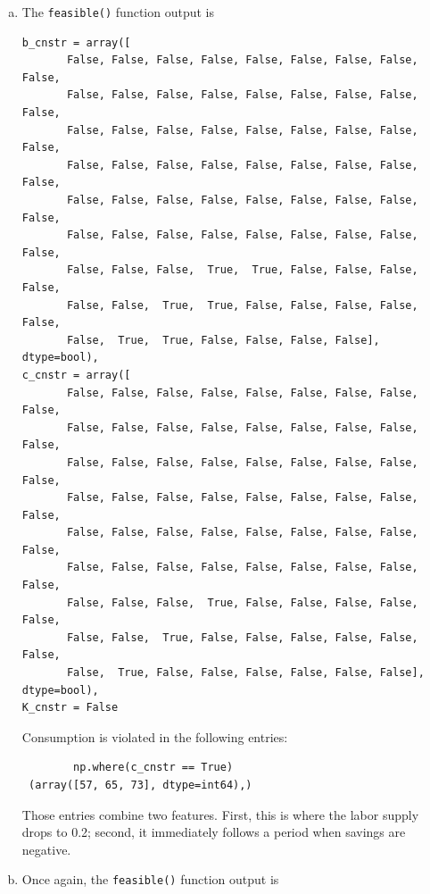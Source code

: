 \documentclass[letterpaper,12pt]{article}
\theoremstyle{definition}
\begin{document}
\begin{enumerate}
\begin{enumerate}[(a)]
		\item The \texttt{feasible()} function output is
		
		\begin{verbatim}
b_cnstr = array([
       False, False, False, False, False, False, False, False, False,
       False, False, False, False, False, False, False, False, False,
       False, False, False, False, False, False, False, False, False,
       False, False, False, False, False, False, False, False, False,
       False, False, False, False, False, False, False, False, False,
       False, False, False, False, False, False, False, False, False,
       False, False, False,  True,  True, False, False, False, False,
       False, False,  True,  True, False, False, False, False, False,
       False,  True,  True, False, False, False, False], dtype=bool),
c_cnstr = array([
       False, False, False, False, False, False, False, False, False,
       False, False, False, False, False, False, False, False, False,
       False, False, False, False, False, False, False, False, False,
       False, False, False, False, False, False, False, False, False,
       False, False, False, False, False, False, False, False, False,
       False, False, False, False, False, False, False, False, False,
       False, False, False,  True, False, False, False, False, False,
       False, False,  True, False, False, False, False, False, False,
       False,  True, False, False, False, False, False, False], dtype=bool),
K_cnstr = False
		\end{verbatim}				
		Consumption is violated in the following entries: 
		\begin{verbatim}
		np.where(c_cnstr == True)
 (array([57, 65, 73], dtype=int64),)
		\end{verbatim}
		Those entries combine two features. First, this is where the labor supply drops to 0.2; second, it immediately follows a period when savings are negative.
		
		\item Once again, the \texttt{feasible()} function output is
		

\end{enumerate}
\end{enumerate}
\end{document}
